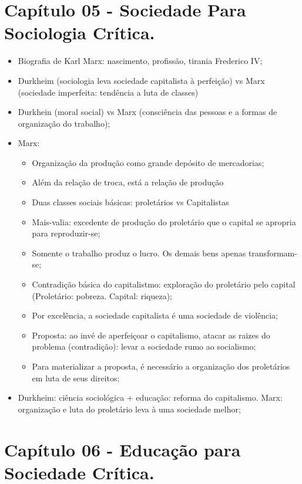 \documentclass[a4paper,12pt]{article}
\begin{document}
\section {Capítulo 05 - Sociedade Para Sociologia Crítica.}

\begin{itemize}
\item Biografia de Karl Marx: nascimento, profissão, tirania Frederico IV;
\item Durkheim (sociologia leva sociedade capitalista à perfeição) vs Marx (sociedade imperfeita: tendência a luta de classes)
\item Durkhein (moral social) vs Marx (consciência das pessoas e a formas de organização do trabalho);
\item Marx: 
\begin{itemize}
\item Organização da produção como grande depósito de mercadorias;
\item Além da relação de troca, está a relação de produção
\item Duas classes sociais básicas: proletários vs Capitalistas
\item Mais-valia: excedente de produção do proletário que o capital se apropria para reproduzir-se;
\item Somente o trabalho produz o lucro. Os demais bens apenas transformam-se;
\item Contradição básica do capitalistmo: exploração do proletário pelo capital (Proletário: pobreza. Capital: riqueza);
\item Por excelência, a sociedade capitalista é uma sociedade de violência;
\item Proposta: ao invé de aperfeiçoar o capitalismo, atacar as raizes do problema (contradição): levar a sociedade rumo ao socialismo;
\item Para materializar a proposta, é necessário a organização dos proletários em luta de seus direitos;
\end{itemize}
\item Durkheim: ciência sociológica + educação: reforma do capitalismo. Marx: organização e luta do proletário leva à uma sociedade melhor;
\end{itemize}


\section{Capítulo 06 - Educação para Sociedade Crítica.}
\end{document}

